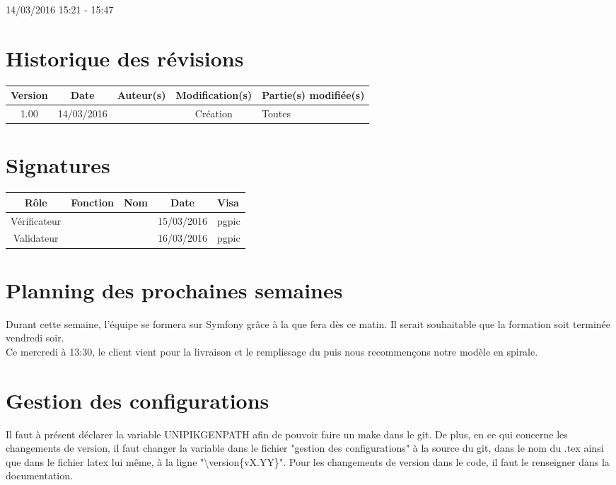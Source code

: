 \documentclass [a4paper] {article}
\begin{document}
14/03/2016			 				%
\hfill   
\hfill 	 15:21 - 15:47 				%



\section*{Historique des révisions}
\begin{center}
			\begin{tabular}{| c | c | c | c | p{4cm} |}
				\hline
				\rowcolor{Gray}
				Version & Date & Auteur(s) & Modification(s) & Partie(s) modifiée(s)		 \\
				\hline
				1.00 & 14/03/2016 & \Pierre & Création & Toutes \\
		\hline		
			\end{tabular}
		\end{center}

\section*{Signatures}

		\begin{center}
			\begin{tabular}{| c | c | c | c | p{4cm} |}
				\hline
				\rowcolor{Gray}
				Rôle & Fonction & Nom & Date & Visa		 \\
				\hline
				Vérificateur & \RQA & \Kafui & 15/03/2016 & pgpic \\[30pt]
				\hline
				Validateur & \CP & \Sergi & 16/03/2016 & pgpic \\[30pt]	
				\hline
			\end{tabular}
		\end{center}
		
\newpage		



\section{Planning des prochaines semaines}
Durant cette semaine, l'équipe se formera sur Symfony grâce à la \FF{} que \Florian{} fera dès ce matin. Il serait souhaitable que la formation soit terminée vendredi soir. \\
Ce mercredi à 13:30, le client vient pour la livraison et le remplissage du \CDR{} puis nous recommençons notre modèle en spirale.


\section{Gestion des configurations}
Il faut à présent déclarer la variable UNIPIKGENPATH afin de pouvoir faire un make dans le git. De plus, en ce qui concerne les changements de version, il faut changer la variable dans le fichier "gestion des configurations" à la source du git, dans le nom du .tex ainsi que dans le fichier latex lui même, à la ligne "\textbackslash version\{vX.YY\}".
Pour les changements de version dans le code, il faut le renseigner dans la documentation.
\end{document}
